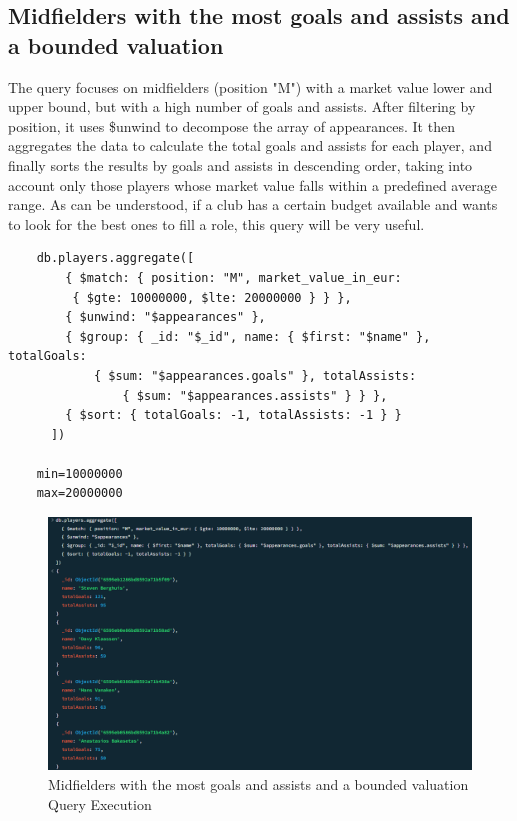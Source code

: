 \documentclass{Configuration_Files/PoliMi3i_thesis}
\begin{document}
\subsection{Midfielders with the most goals and assists and a bounded valuation}
The query focuses on midfielders (position "M") with a market value lower and upper bound, but with a high number of goals and assists. After filtering by position, it uses \$unwind to decompose the array of appearances. It then aggregates the data to calculate the total goals and assists for each player, and finally sorts the results by goals and assists in descending order, taking into account only those players whose market value falls within a predefined average range. As can be understood, if a club has a certain budget available and wants to look for the best ones to fill a role, this query will be very useful.
\begin{verbatim}
    db.players.aggregate([
        { $match: { position: "M", market_value_in_eur:
         { $gte: 10000000, $lte: 20000000 } } },
        { $unwind: "$appearances" },
        { $group: { _id: "$_id", name: { $first: "$name" }, totalGoals: 
            { $sum: "$appearances.goals" }, totalAssists: 
                { $sum: "$appearances.assists" } } },
        { $sort: { totalGoals: -1, totalAssists: -1 } }
      ])    
      
    min=10000000
    max=20000000  
\end{verbatim}

\begin{figure}[htbp]
    \centering
    \includegraphics[scale=0.6]{Images/Queries/Midfielders_goal_assit_bounded_value/mgabv.png}
    \caption{Midfielders with the most goals and assists and a bounded valuation Query Execution}
\end{figure}
\end{document}

